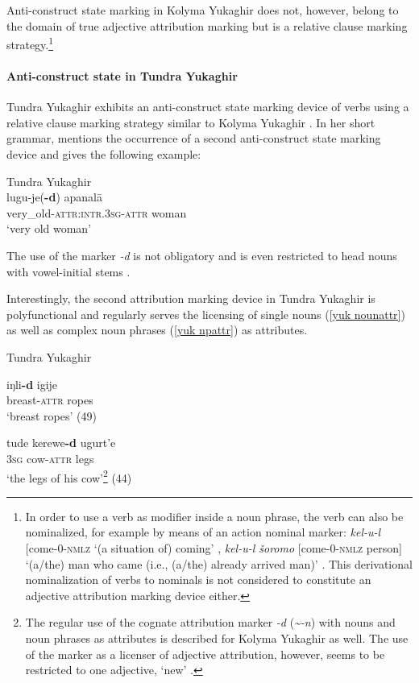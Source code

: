 Anti\hyp{}construct state marking in Kolyma Yukaghir does not, however, belong to the domain of true adjective attribution marking but is a relative clause marking strategy.\footnote{In order to use a verb as modifier inside a noun phrase, the verb can also be nominalized, for example by means of an action nominal marker: \textit{kel-u-l} [come-0-\textsc{nmlz} ‘(a situation of) coming’ \citep[147]{maslova2003b}, \textit{kel-u-l šoromo} [come-0-\textsc{nmlz} person] ‘(a/the) man who came (i.e., (a/the) already arrived man)’ \citep[67]{maslova2003b}. This derivational nominalization of verbs to nominals is not considered to constitute an adjective attribution marking device either.}

\paragraph*{Anti\hyp{}construct state in Tundra Yukaghir}
Tundra Yukaghir exhibits an anti\hyp{}construct state marking device of verbs using a relative clause marking strategy similar to Kolyma Yukaghir \citep[49–50, passim]{maslova2003a}. In her short grammar, \cite{maslova2003a} mentions the occurrence of a second anti\hyp{}construct state marking device and gives the following example:
\begin{exe}
\ex 	
\rm{Tundra Yukaghir \citep[50]{maslova2003a}}\\
\gll 	lugu-je(\textbf{-d}) apanalā\\
	very\_old-\textsc{attr:intr.3sg}-\textsc{attr} woman\\
\glt	‘very old woman’
\end{exe}
The use of the marker \textit{-d} is not obligatory and is even restricted to head nouns with vowel-initial stems \citep[50]{maslova2003a}.

Interestingly, the second attribution marking device in Tundra Yukaghir is polyfunctional and regularly serves the licensing of single nouns (\ref{yuk nounattr}) as well as complex noun phrases (\ref{yuk npattr}) as attributes.
\begin{exe}
\ex 
\rm{Tundra Yukaghir \citep{maslova2003a}}
\begin{xlist}
\ex
\label{yuk nounattr}
\gll	iŋli\textbf{-d} igije\\
	breast-\textsc{attr} ropes\\
\glt	‘breast ropes’ (49)

\ex
\label{yuk npattr}
\gll	tude kerewe\textbf{-d} ugurt'e\\
	\textsc{3sg} cow-\textsc{attr} legs\\
\glt	‘the legs of his cow’\footnote{The regular use of the cognate attribution marker \textit{-d} (\textit{\textasciitilde-n}) with nouns and noun phrases as attributes is described for Kolyma Yukaghir as well. The use of the marker as a licenser of adjective attribution, however, seems to be restricted to one adjective, ‘new’ \citep[71]{maslova2003b}.} (44)
\end{xlist}
\end{exe}

